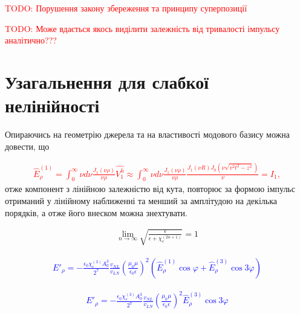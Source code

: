 \textcolor{red} {TODO: Порушення закону збереження та принципу суперпозиції}

\textcolor{red} {TODO: Може вдається якось виділити залежність від 
тривалості імпульсу аналітично???}

\section{Узагальнення для слабкої нелінійності}

Опираючись на геометрію джерела та на властивості модового базису можна 
довести, що 

\textcolor{red} { \begin{equation} \begin{aligned} \label{eq:erho_norm}
\hat{E}_\rho^{(1)} = \int_0^\infty \nu d \nu 
\frac{J_1(\nu \rho)}{\nu \rho} \hat{V_1^h} \approx
\int_0^\infty \nu d \nu \frac{J_1(\nu \rho)}{\nu \rho} 
\frac{J_1(\nu R) J_0(\nu \sqrt{v^2t^2-z^2})}{\nu} = I_1,
\end{aligned} \end{equation} }
%
отже компонент з лінійною залежністю від кута, повторює за формою 
імпульс отриманий у лінійному наближенні та менший за амплітудою на 
декілька порядків, а отже його внеском можна знехтувати.

\begin{equation*} \begin{aligned}
\lim_{n \to \infty} 
\sqrt{ \frac{\epsilon}{ \epsilon + \chi_e^{(2n+1)}} } = 1
\end{aligned} \end{equation*}

\textcolor{blue} { \begin{equation*} \begin{aligned}
E'_\rho = - \frac{\epsilon_0 \chi_e^{(3)} A_0^3}{2^7}
\frac{v_{NL}}{v_{LN}}
\left( \frac{\mu_0 \mu}{\epsilon_0 \epsilon} \right)^2
\left(\hat{E}_\rho^{(1)} \cos \varphi +
\hat{E}_\rho^{(3)} \cos 3 \varphi \right)
\end{aligned} \end{equation*} }

\textcolor{blue} { \begin{equation*} \begin{aligned}
E'_\rho = - \frac{\epsilon_0 \chi_e^{(3)} A_0^3}{2^7}
\frac{v_{NL}}{v_{LN}}
\left( \frac{\mu_0 \mu}{\epsilon_0 \epsilon} \right)^2 
\hat{E}_\rho^{(3)} \cos 3 \varphi
\end{aligned} \end{equation*} }

